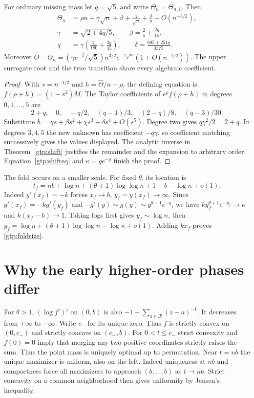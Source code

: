 \begin{corollary}\label{gtp:gold}
For ordinary missing mass let $q=\sqrt5$ and write $\Theta_n=\Theta_{n,1}$.
Then
\begin{align*}
 \Theta_n&=\rho n+\gamma\sqrt n+\beta+\frac{\chi}{\sqrt n}
             +\frac{\delta}{n}+O(n^{-3/2}),\\
 \gamma&=\sqrt{2+4q/5},\qquad \beta=\frac25+\frac{2q}{15},\\
 \chi&=\gamma\left(\frac{31}{180}+\frac{2q}{45}\right),\qquad
 \delta=\frac{605+251q}{3375}.
\end{align*}
Moreover $\widehat\Theta-\Theta_n
 =(\gamma e^{-\beta}/\sqrt5)n^{3/2} e^{-\gamma\sqrt n}
 (1+O(n^{-1/2}))$. The upper surrogate root and the true transition
share every algebraic coefficient.
\end{corollary}
\begin{proof}
With $s=n^{-1/2}$ and $h=\widehat\Theta/n-\rho$, the defining equation
is $f(\rho+h)=(1-s^2)M$. The Taylor coefficients of $e^\rho f(\rho+h)$
in degrees $0,1,\ldots,5$ are
\[
 2+q,\quad 0,\quad -q/2,\quad(q-1)/3,\quad(2-q)/8,\quad(q-3)/30 .
\]
Substitute $h=\gamma s+\beta s^2+\chi s^3+\delta s^4+O(s^5)$.
Degree two gives $q\gamma^2/2=2+q$. In degrees $3,4,5$ the new unknown
has coefficient $-q\gamma$, so coefficient matching successively gives
the values displayed. The analytic inverse in Theorem~\ref{gtp:shift}
justifies the remainder and the expansion to arbitrary order.
Equation~\eqref{gtp:shifteq} and $\kappa=q e^{-\rho}$ finish the proof.
\end{proof}

The fold occurs on a smaller scale. For fixed $\theta$, its location is
\begin{equation}\label{gtp:foldsize}
 t_f=nb+\log n+(\theta+1)\log\log n+1-b-\log\kappa+o(1).
\end{equation}
Indeed $y'(x_f)=-k$ forces $x_f\to b$, $y_f=y(x_f)\to\infty$.
Since $g'(x_f)=-k g'(y_f)$ and $-g'(y)\sim g(y)\sim y^{\theta+1}e^{-y}$,
we have $k y_f^{\theta+1}e^{-y_f}\to\kappa$ and $k(x_f-b)\to1$.
Taking logs first gives $y_f\sim\log n$, then
$y_f=\log n+(\theta+1)\log\log n-\log\kappa+o(1)$.
Adding $kx_f$ proves \eqref{gtp:foldsize}.

\section{Why the early higher-order phases differ}
For $\theta>1$, $(\log f')'$ on $(0,b)$ is also
$-1+\sum_{a\in\mathcal R}(z-a)^{-1}$. It decreases from $+\infty$ to
$-\infty$. Write $c_-$ for its unique zero. Thus $f$ is strictly convex
on $(0,c_-)$ and strictly concave on $(c_-,b)$. For $0<t\le c_-$
strict convexity and $f(0)=0$ imply that merging any two positive
coordinates strictly raises the sum. Thus the point mass is uniquely
optimal up to permutation. Near $t=nb$ the unique maximizer
is uniform, also on the left. Indeed uniqueness at $nb$ and compactness
force all maximizers to approach $(b,\ldots,b)$ as $t\to nb$. Strict concavity on
a common neighborhood then gives uniformity by Jensen's inequality.

